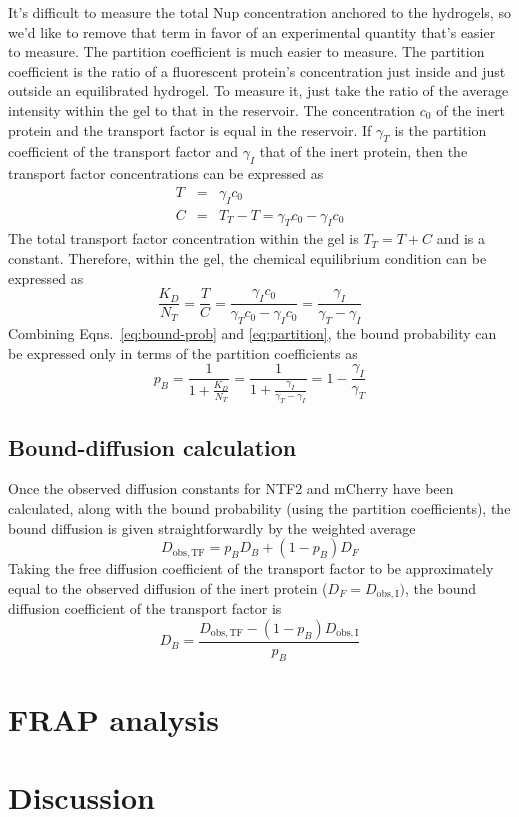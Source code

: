It's difficult to measure the total Nup concentration anchored to the hydrogels, so we'd like to remove that term in favor of an experimental quantity that's easier to measure.  The partition coefficient is much easier to measure.  The partition coefficient is the ratio of a fluorescent protein's concentration just inside and just outside an equilibrated hydrogel.  To measure it, just take the ratio of the average intensity within the gel to that in the reservoir.  The concentration $c_0$ of the inert protein and the transport factor is equal in the reservoir.  If $\gamma_T$ is the partition coefficient of the transport factor and $\gamma_I$ that of the inert protein, then the transport factor concentrations can be expressed as
\begin{eqnarray}
T &=& \gamma_I c_0\\
C & =& T_T - T = \gamma_Tc_0 - \gamma_I c_0
\label{eq:gamma}
\end{eqnarray} 
The total transport factor concentration within the gel is $T_T = T + C$ and is a constant.
Therefore, within the gel, the chemical equilibrium condition can be expressed as
\begin{equation}
\frac{K_D}{N_T} = \frac{T}{C} = \frac{\gamma_I c_0}{\gamma_T c_0 - \gamma_I c_0} = \frac{\gamma_I}{\gamma_T - \gamma_I}
\label{eq:partition}
\end{equation}
Combining Eqns.~\ref{eq:bound-prob} and \ref{eq:partition}, the bound probability can be expressed only in terms of the partition coefficients as
\begin{equation}
p_B= \frac{1}{1+\frac{K_D}{N_T}} = \frac{1}{1+\frac{\gamma_I}{\gamma_T - \gamma_I}} = 1 - \frac{\gamma_I}{\gamma_T}
\label{eq:bound-prob-final}
\end{equation}

\subsection{Bound-diffusion calculation}

Once the observed diffusion constants for NTF2 and mCherry have been calculated, along with the bound probability (using the partition coefficients), the bound diffusion is given straightforwardly by the weighted average
\begin{equation}
D_\mathrm{obs, TF} = p_B D_B + (1-p_B) D_F
\label{eq:weighted-average}
\end{equation}
Taking the free diffusion coefficient of the transport factor to be approximately equal to the observed diffusion of the inert protein ($D_F = D_\mathrm{obs,I})$, the bound diffusion coefficient of the transport factor is
\begin{equation}
D_B = \frac{D_\mathrm{obs, TF}-(1-p_B) D_\mathrm{obs,I}}{p_B}
\label{eq:d-bound}
\end{equation}

\section{FRAP analysis}
\section{Discussion}